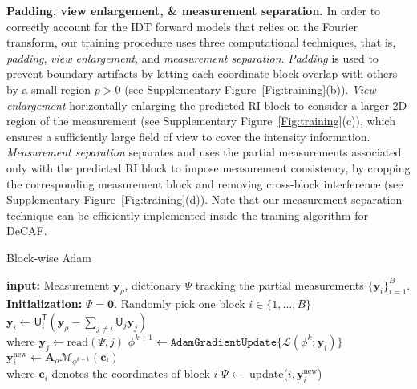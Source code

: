 \documentclass[11pt]{article}
\theoremstyle{plain} %
\def\proposed{DeCAF}
\def\cbm{{\bm{c}}}
\def\ybm{{\bm{y}}}
\def\Abm{{\bm{A}}}
\def\Tsf{{\mathsf{T}}}
\def\Usf{{\mathsf{U}}}
\def\Mcal{{\mathcal{M}}}
\def\Lcal{{\mathcal{L}}}
\begin{document}
\vspace{0.5em}
\noindent
\textbf{Padding, view enlargement, \& measurement separation.} In order to correctly account for the IDT forward models that relies on the Fourier transform, our training procedure uses three computational techniques, that is, \emph{padding}, \emph{view enlargement}, and \emph{measurement separation}. 
\emph{Padding} is used to prevent boundary artifacts by letting each coordinate block overlap with others by a small region $p>0$ (see Supplementary Figure~\ref{Fig:training}(b)). \emph{View enlargement} horizontally enlarging the predicted RI block to consider a larger 2D region of the measurement (see Supplementary Figure~\ref{Fig:training}(c)), which ensures a sufficiently large field of view to cover the intensity information. 
\emph{Measurement separation} separates and uses the partial measurements associated only with the predicted RI block to impose measurement consistency, by cropping the corresponding measurement block and removing cross-block interference (see Supplementary Figure~\ref{Fig:training}(d)).
Note that our measurement separation technique can be efficiently implemented inside the training algorithm for \proposed.

\renewcommand{\algorithmiccomment}[1]{\bgroup\hfill{$\triangleright$~#1}\egroup}
\begin{algorithm}[t]
\caption{Block-wise Adam}
\label{Alg:blockwise}
\begin{algorithmic}[1]
\STATE \textbf{input: } Measurement $\ybm_\rho$, dictionary $\Psi$ tracking the partial measurements $\{\ybm_i\}_{i=1}^B$.
\STATE \textbf{Initialization:} $\Psi = \bm{0}$.
\STATE Randomly pick one block $i\in\{1,...,B\}$
\STATE $\ybm_i \leftarrow \Usf_i^\Tsf(\ybm_\rho-\sum_{j\neq i}\Usf_j\ybm_j)$ \\
\quad\quad where $\ybm_j \leftarrow \text{read}(\Psi, j)$ 
\STATE $\phi^{k+1} \leftarrow \texttt{AdamGradientUpdate}\{\Lcal(\phi^{k}; \ybm_i)\}$ 
\STATE $\ybm^\text{new}_i \leftarrow \Abm_\rho \Mcal_{\phi^{k+1}}(\cbm_i)$  \\
\quad\quad where $\cbm_i$ denotes the coordinates of block $i$
\STATE $\Psi \leftarrow$ update($i, \ybm_i^\text{new}$)
\ENDFOR
\end{algorithmic}
\end{algorithm}
\end{document}
